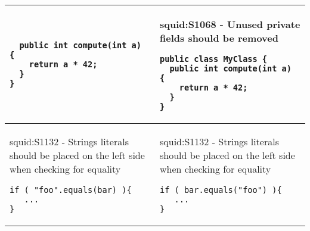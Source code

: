 \documentclass[a4paper]{article}
\begin{document}
\begin{center}
\begin{tabular}{|p{}|p{}|}
\begin{lstlisting}
  public int compute(int a) {
    return a * 42;
  }
}
  	\end{lstlisting} 
   	&
   	\begin{center}
  	squid:S1068 - Unused private fields should be removed
  	\end{center}  
   	\begin{lstlisting}
public class MyClass {
  public int compute(int a) {
    return a * 42;
  }
}
  	\end{lstlisting}  \\
  	\hline
  	\begin{center}
  	squid:S1132 - Strings literals should be placed on the left side when checking for equality
  	\end{center} 
	\begin{lstlisting}
if ( "foo".equals(bar) ){
   ...
}
  	\end{lstlisting} 
   	& 
   	\begin{center}
  	squid:S1132 - Strings literals should be placed on the left side when checking for equality
  	\end{center} 
   	\begin{lstlisting}
if ( bar.equals("foo") ){
   ...
}
  	\end{lstlisting}  \\
  	\hline  	
\end{tabular}  
\end{center} 
\end{document}
